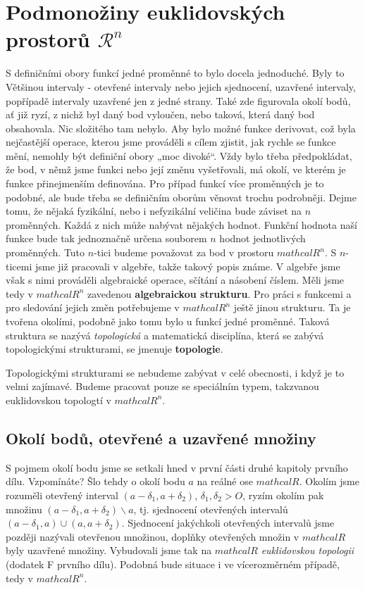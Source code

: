   \section{Podmonožiny euklidovských prostorů \(\mathcal{R}^n\)}\label{mai:IIchapVIsecI}
    S definičními obory funkcí jedné proměnné to bylo docela jednoduché. Byly to Většinou intervaly
    - otevřené intervaly nebo jejich sjednocení, uzavřené intervaly, popřípadě intervaly uzavřené
    jen z jedné strany. Také zde figurovala okolí bodů, ať již ryzí, z nichž byl daný bod vyloučen,
    nebo taková, která daný bod obsahovala. Nic složitého tam nebylo. Aby bylo možné funkce
    derivovat, což byla nejčastější operace, kterou jsme prováděli s cílem zjistit, jak rychle se
    funkce mění, nemohly být definiční obory „moc divoké“. Vždy bylo třeba předpokládat, že bod, v
    němž jsme funkci nebo její změnu vyšetřovali, má okolí, ve kterém je funkce přinejmenším
    definována. Pro případ funkcí více proměnných je to podobné, ale bude třeba se definičním oborům
    věnovat trochu podrobněji. Dejme tomu, že nějaká fyzikální, nebo i nefyzikální veličina bude
    záviset na \(n\) proměnných. Každá z nich může nabývat nějakých hodnot. Funkční hodnota naší
    funkce bude tak jednoznačně určena souborem \(n\) hodnot jednotlivých proměnných. Tuto
    \(n\)-tici budeme považovat za bod v prostoru \(mathcal{R}^n\). S \(n\)-ticemi jsme již
    pracovali v algebře, takže takový popis známe. V algebře jsme však s nimi prováděli algebraické
    operace, sčítání a násobení číslem. Měli jsme tedy v \(mathcal{R}^n\) zavedenou
    \textbf{algebraickou strukturu}. Pro práci s funkcemi a pro sledování jejich změn 
    potřebujeme v \(mathcal{R}^n\) ještě jinou strukturu. Ta je tvořena okolími, podobně jako tomu
    bylo u funkcí jedné proměnné. Taková struktura se nazývá \emph{topologická} a matematická
    disciplína, která se zabývá topologickými strukturami, se jmenuje \textbf{topologie}.

    Topologickými strukturami se nebudeme zabývat v celé obecnosti, i když je to velmi zajímavé.
    Budeme pracovat pouze se speciálním typem, takzvanou euklidovskou topologtí v \(mathcal{R}^n\).

    \subsection{Okolí bodů, otevřené a uzavřené množiny}
    S pojmem okolí bodu jsme se setkali hned v první části druhé kapitoly prvního dílu. Vzpomínáte?
    Šlo tehdy o okolí bodu \(a\) na reálné ose \(mathcal{R}\). Okolím jsme rozuměli otevřený
    interval \((a - \delta_1,a + \delta_2)\), \(\delta_1, \delta_2 > O\), ryzím okolím pak množinu
    \((a - \delta_1, a + \delta_2)\backslash{a}\), tj. sjednocení otevřených intervalů \((a -
    \delta_1, a) \cup (a, a + \delta_2)\). Sjednocení jakýchkoli otevřených intervalů jsme později
    nazývali otevřenou množinou, doplňky otevřených množin v \(mathcal{R}\) byly uzavřené množiny.
    Vybudovali jsme tak na \(mathcal{R}\) \emph{euklidovskou topologii} (dodatek F prvního dílu).
    Podobná bude situace i ve vícerozměrném případě, tedy v \(mathcal{R}^n\).

